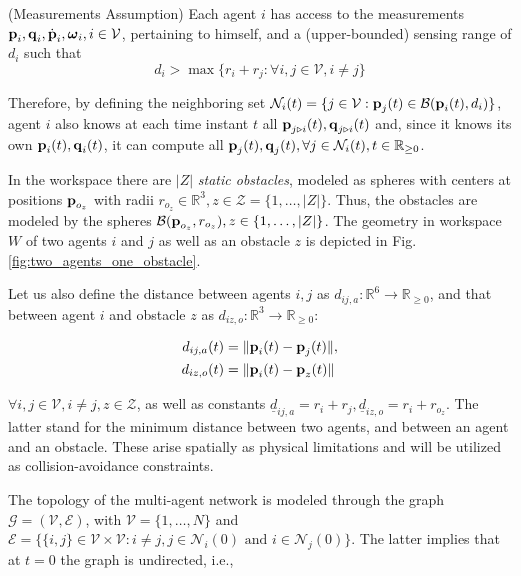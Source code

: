 \begin{assumption} (Measurements Assumption)
  Each agent $i$ has access to the measurements
  $\bm{\mathbf{p}}_i, \bm{\mathbf{q}}_i, \dot{\bm{\mathbf{p}}}_i, \bm{\mathbf{\omega}}_i, i\in\mathcal{V}$,
  pertaining to himself, and a (upper-bounded) sensing range of $d_i$ such that
  $$d_i > \max\{r_i + r_j : \forall i,j \in \mathcal{V}, i \neq j\}$$
\end{assumption}

Therefore, by defining the neighboring set
$\mathcal{N}_i(t) = \{j\in\mathcal{V} : \bm{\mathbf{p}}_j(t)\in\mathcal{B}(\bm{\mathbf{p}}_i(t), d_i)\}$,
agent $i$ also knows at each time instant $t$ all
$\bm{\mathbf{p}}_{j \triangleright i}(t), \bm{\mathbf{q}}_{j \triangleright i}(t)$
and, since it knows its own $\bm{\mathbf{p}}_i(t), \bm{\mathbf{q}}_i(t)$, it can compute all
$\bm{\mathbf{p}}_{j}(t), \bm{\mathbf{q}}_{j}(t), \forall j\in \mathcal{N}_i(t),t\in\mathbb{R}_{\geq 0}$.

In the workspace there are $|Z|$ \textit{static obstacles}, modeled as
spheres with centers at positions
$\bm{\mathbf{p}}_{o_z}$ with radii $r_{o_z}\in \mathbb{R}^3, z \in \mathcal{Z} = \{1,\dots,|Z| \}$.
Thus, the obstacles are modeled by the spheres
$\mathcal{B}(\bm{\mathbf{p}}_{o_z}, r_{o_z}), z \in \{1,\dots,|Z|\}$. The geometry in
workspace $W$ of two agents $i$ and $j$ as well as an obstacle $z$ is depicted
in Fig. \ref{fig:two_agents_one_obstacle}.

Let us also define the distance between agents $i,j$ as
$d_{ij,a}: \mathbb{R}^6 \to \mathbb{R}_{\geq 0}$, and that between agent $i$
and obstacle $z$ as $d_{iz,o} : \mathbb{R}^3 \to \mathbb{R}_{\geq 0}$:

\begin{subequations}
	\begin{align}
    d_{ij,a}(t) &= \| \bm{\mathbf{p}}_i(t) - \bm{\mathbf{p}}_j(t) \|, \\
    d_{iz,o}(t) &= \| \bm{\mathbf{p}}_i(t) - \bm{\mathbf{p}}_z(t) \|
	\end{align}
\end{subequations}

$\forall i, j \in \mathcal{V}, i \neq j, z \in \mathcal{Z}$, as well as
constants $\underline{d}_{ij, a} = r_{i} + r_{j},
\underline{d}_{iz, o} = r_{i} + r_{o_z}$. The latter stand for the minimum
distance between two agents, and between an agent and an obstacle. These arise
spatially as physical limitations and will be utilized as collision-avoidance
constraints.

The topology of the multi-agent network is modeled through the graph
$\mathcal{G} = (\mathcal{V},\mathcal{E})$, with $\mathcal{V}=\{1,\dots,N\}$ and
$\mathcal{E}=\big\{\{i,j\}\in\mathcal{V}\times\mathcal{V} : i \neq j, j\in\mathcal{N}_i(0) \text{ and } i\in\mathcal{N}_j(0)\big\}$.
The latter implies that at $t=0$ the graph is undirected, i.e.,

